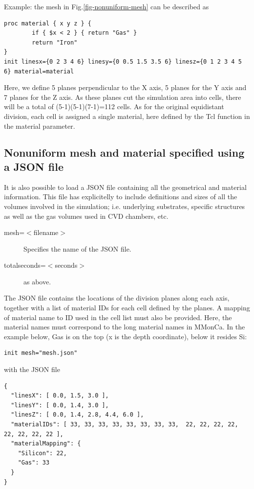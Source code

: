 Example: the mesh in Fig.\ref{fig-nonuniform-mesh} can be described as

\begin{lstlisting}
proc material { x y z } {
        if { $x < 2 } { return "Gas" }
        return "Iron"
}
init linesx={0 2 3 4 6} linesy={0 0.5 1.5 3.5 6} linesz={0 1 2 3 4 5 6} material=material
\end{lstlisting}

Here, we define 5 planes perpendicular to the X axis, 5 planes for the Y axis and 7 planes for the Z axis. As these planes cut the simulation area into cells, there will be a total of (5-1)(5-1)(7-1)=112 cells. As for the original equidistant division, each cell is assigned a single material, here defined by the Tcl function in the material parameter.

\subsection{Nonuniform mesh and material specified using a JSON file}

It is also possible to load a JSON file containing all the geometrical and material information. This file has explicitelly to include definitions and sizes of all the volumes involved in the simulation; i.e. underlying substrates, specific structures as well as the gas volumes used in CVD chambers, etc. 

\begin{description}
\item [mesh=$<$filename$>$] Specifies the name of the JSON file.
\item [totalseconds=$<$seconds$>$] as above.
\end{description}

The JSON file contains the locations of the division planes along each axis, together with a list of material IDs for each cell defined by the planes. A mapping of material name to ID used in the cell list must also be provided. Here, the material names must correspond to the long material names in MMonCa. In the example below, Gas is on the top (x is the depth coordinate), below it resides Si:

\begin{lstlisting}
init mesh="mesh.json"
\end{lstlisting}

with the JSON file

\begin{lstlisting}
{
  "linesX": [ 0.0, 1.5, 3.0 ],
  "linesY": [ 0.0, 1.4, 3.0 ],
  "linesZ": [ 0.0, 1.4, 2.8, 4.4, 6.0 ],
  "materialIDs": [ 33, 33, 33, 33, 33, 33, 33, 33,  22, 22, 22, 22, 22, 22, 22, 22 ],
  "materialMapping": { 
    "Silicon": 22,
    "Gas": 33 
  } 
}
\end{lstlisting}

